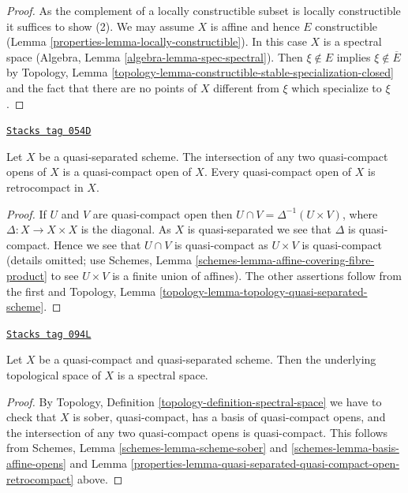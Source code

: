 \begin{proof}

As the complement of a locally constructible subset is locally
constructible it suffices to show (2). We may assume $X$ is
affine and hence $E$ constructible (Lemma \ref{properties-lemma-locally-constructible}).
In this case $X$ is a spectral space
(Algebra, Lemma \ref{algebra-lemma-spec-spectral}).
Then $\xi \not \in E$ implies $\xi \not \in \overline{E}$ by
Topology, Lemma \ref{topology-lemma-constructible-stable-specialization-closed}
and the fact that there are no points of $X$ different from $\xi$
which specialize to $\xi$.
\end{proof}

\begin{lemma}
\label{properties-lemma-quasi-separated-quasi-compact-open-retrocompact}
\href{https://stacks.math.columbia.edu/tag/054D}{\texttt{Stacks tag 054D}}

Let $X$ be a quasi-separated scheme. The intersection of any two
quasi-compact opens of $X$ is a quasi-compact open of $X$.
Every quasi-compact open of $X$ is retrocompact in $X$.
\end{lemma}

\begin{proof}
If $U$ and $V$ are quasi-compact open then
$U \cap V = \Delta^{-1}(U \times V)$, where $\Delta : X \to X \times X$
is the diagonal. As $X$ is quasi-separated we see that $\Delta$ is
quasi-compact. Hence we see that $U \cap V$ is quasi-compact as
$U \times V$ is quasi-compact (details omitted; use
Schemes, Lemma \ref{schemes-lemma-affine-covering-fibre-product}
to see $U \times V$ is a finite union of affines).
The other assertions follow from the first and
Topology, Lemma \ref{topology-lemma-topology-quasi-separated-scheme}.
\end{proof}

\begin{lemma}
\label{properties-lemma-quasi-compact-quasi-separated-spectral}
\href{https://stacks.math.columbia.edu/tag/094L}{\texttt{Stacks tag 094L}}

Let $X$ be a quasi-compact and quasi-separated scheme.
Then the underlying topological space of $X$ is a spectral space.
\end{lemma}

\begin{proof}

By Topology, Definition \ref{topology-definition-spectral-space}
we have to check that $X$ is sober, quasi-compact, has a basis
of quasi-compact opens, and the intersection of any two
quasi-compact opens is quasi-compact. This follows from
Schemes, Lemma \ref{schemes-lemma-scheme-sober} and
\ref{schemes-lemma-basis-affine-opens}
and
Lemma \ref{properties-lemma-quasi-separated-quasi-compact-open-retrocompact}
above.
\end{proof}

